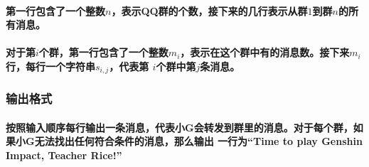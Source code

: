\documentclass[final,11pt,oneside,UTF8]{report}
\begin{document}
\paragraph{
    第一行包含了一个整数$n$，表示QQ群的个数，接下来的几行表示从群$1$到群$n$的所有消息。
}
\paragraph{
    对于第$i$个群，第一行包含了一个整数$m_i$，表示在这个群中有的消息数。接下来$m_i$行，每行一个字符串$s_{i,j}$，代表第
    $i$个群中第$j$条消息。
}
\subsubsection{输出格式}
\paragraph{
    按照输入顺序每行输出一条消息，代表小G会转发到群里的消息。对于每个群，如果小G无法找出任何符合条件的消息，那么输出
    一行为“Time to play Genshin Impact, Teacher Rice!”
}
\end{document}
